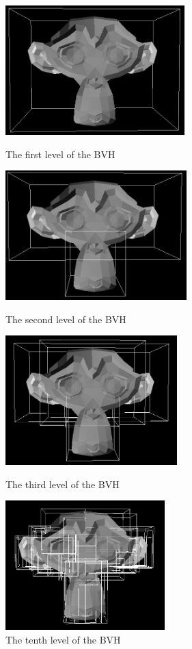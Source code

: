 \documentclass{article}
\begin{document}
    \begin{figure}[!htb]
          \includegraphics[width=\linewidth, height=5cm]{images/bvh_level_one}
          \caption*{The first level of the BVH}
        \endminipage\hfill
          \includegraphics[width=\linewidth, height=5cm]{images/bvh_level_two}
          \caption*{The second level of the BVH}
        \endminipage
        \newline
          \includegraphics[width=\linewidth, height=5cm]{images/bvh_level_three}
          \caption*{The third level of the BVH}
        \endminipage\hfill
          \includegraphics[width=\linewidth, height=5cm]{images/bvh_level_ten}
          \caption*{The tenth level of the BVH}
        \endminipage
    \end{figure}
\end{document}
